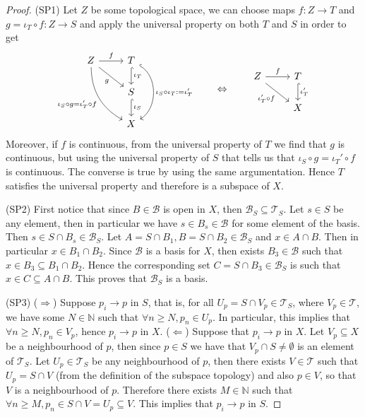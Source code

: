 \begin{proof}
  (SP1) Let \(Z\) be some topological space, we can choose maps \(f: Z \to T\)
  and \(g = \iota_T \circ f : Z \to S\) and apply the universal property on both
  \(T\) and \(S\) in order to get
  \[
    \begin{tikzcd}
      Z \ar[r,"f"] 
      \ar[rd, swap, "g"]
      \ar[rdd, swap, bend right,
      "\iota_S \circ g = \iota_T' \circ f"]
        &T \ar[d, hook, "\iota_T"] 
        \ar[dd, hook, bend left = 60, "\iota_S \circ \iota_T := \iota_T'"]\\
        &S \ar[d, hook, "\iota_S"] \\
        &X
    \end{tikzcd}
    \qquad \Leftrightarrow \qquad
    \begin{tikzcd}
      Z \ar[dr, swap, "\iota_T' \circ f"] \ar[r, "f"] 
        &T \ar[d, hook, "\iota_T'"] \\
        &X
    \end{tikzcd}
  \] 
  Moreover, if \(f\) is continuous, from the universal property of \(T\) we find
  that \(g\) is continuous, but using the universal property of \(S\) that tells
  us that \(\iota_S \circ g = \iota_T' \circ f\) is continuous. The converse is
  true by using the same argumentation. Hence \(T\) satisfies the universal
  property and therefore is a subspace of \(X\).

  (SP2) First notice that since \(B \in \mathcal B\) is open in \(X\), then
  \(\mathcal B_S \subseteq \mathcal T_S\). Let \(s \in S\) be any element, then
  in particular we have \(s \in B_s \in \mathcal B\) for some element of the
  basis. Then \(s \in S \cap B_s \in \mathcal B_S\). Let \(A = S \cap B_1, B = S
  \cap B_2 \in \mathcal B_S\) and \(x \in A \cap B\). Then in particular \(x \in
  B_1 \cap B_2\). Since \(\mathcal B\) is a basis for \(X\), then exists \(B_3
  \in \mathcal B\) such that \(x \in B_3 \subseteq B_1 \cap B_2\). Hence the
  corresponding set \(C = S \cap B_3 \in \mathcal B_S\) is such that \(x \in C
  \subseteq A \cap B\). This proves that \(\mathcal B_S\) is a basis.

  (SP3) (\(\Rightarrow\)) Suppose \(p_i \to p\) in \(S\), that is, for all \(U_p
  = S \cap V_p \in \mathcal T_S\), where \(V_p \in \mathcal T\), we have some
  \(N \in \mathbb{N}\) such that \(\forall n \geq N, p_n \in U_p\). In
  particular, this implies that \(\forall n \geq N, p_n \in V_p\), hence \(p_i
  \to p\) in \(X\).
  (\(\Leftarrow\)) Suppose that \(p_i \to p\) in \(X\). Let \(V_p \subseteq X\)
  be a neighbourhood of \(p\), then since \(p \in S\) we have that \(V_p \cap S
  \neq \emptyset\) is an element of \(\mathcal T_S\). Let \(U_p \in
  \mathcal T_S\) be any neighbourhood of \(p\), then there exists \(V \in
  \mathcal T\) such that \(U_p = S \cap V\) (from the definition of the subspace
  topology) and also \(p \in V\), so that \(V\) is a neighbourhood of \(p\).
  Therefore there exists \(M \in \mathbb{N}\) such that \(\forall n \geq M, p_n
  \in S \cap V = U_p \subseteq V\). This implies that \(p_i \to p\) in \(S\).


\end{proof}

